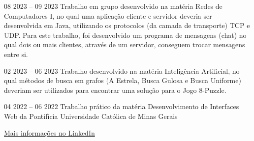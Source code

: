 \documentclass[10pt,a4paper,ragged2e,withhyper]{altacv}
\begin{document}
\begin{paracol}{2}
            {
            }{08 2023 -- 09 2023}{}
            Trabalho em grupo desenvolvido na matéria Redes de Computadores I, no qual uma aplicação cliente e servidor deveria ser desenvolvida em Java, utilizando os protocolos (da camada de transporte) TCP e UDP. Para este trabalho, foi desenvolvido um programa de mensagens (chat) no qual dois ou mais clientes, através de um servidor, conseguem trocar mensagens entre si.\\
            \divider
        
            {
            }{02 2023 -- 06 2023}{}
            Trabalho desenvolvido na matéria Inteligência Artificial, no qual métodos de busca em grafos (A Estrela, Busca Gulosa e Busca Uniforme) deveriam ser utilizados para encontrar uma solução para o Jogo 8-Puzzle.\\
            \divider
            
            {
            }{04 2022 -- 06 2022}{}
            Trabalho prático da matéria Desenvolvimento de Interfaces Web da Pontifícia Universidade Católica de Minas Gerais\\
            \divider

        {\large\color{emphasis}\href{https://www.linkedin.com/in/henriquemcc/details/projects/}{Mais informações no LinkedIn}}
    \end{paracol}
\end{document}
